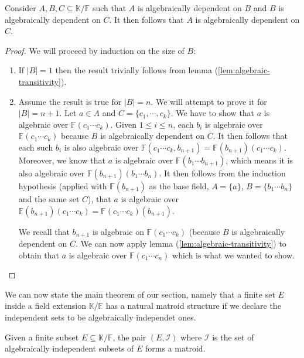 \begin{lemma}\label{lem:algebraic-dependence-transitivity}
	Consider $A, B, C \subseteq \mathbb K / \mathbb{F} $ such that $A$ is algebraically dependent on $B$ and $B$ is algebraically dependent on $C$. It then follows that $A$ is algebraically dependent on $C$.
\end{lemma}

\begin{proof}
	We will proceed by induction on the size of $B$:
	\begin{enumerate}
		\item If $|B| = 1$ then the result trivially follows from lemma (\ref{lem:algebraic-transitivity}).
		\item Assume the result is true for $|B| = n$. We will attempt to prove it for $|B| = n + 1$. Let $a \in A$ and $C = \{c_1, \cdots, c_k\}$. We have to show that $a$ is algebraic over $\mathbb{F}(c _1 \cdots c _k )$. Given $1 \leq i \leq n$, each $b _i$ is algebraic over $\mathbb{F}(c _1 \cdots c _k )$ because $B$ is algebraically dependent on $C$. It then follows that each such $b _i $ is also algebraic over $\mathbb{F}(c _1 \cdots c _k, b _{n + 1}) = \mathbb{F} (b _{n + 1} )(c _1 \cdots c _k )$. Moreover, we know that $a$ is algebraic over $\mathbb{F} (b _1 \cdots b _{n + 1})$, which means it is also algebraic over $\mathbb{F} (b _{n + 1})(b _1 \cdots b _n )$. It then follows from the induction hypothesis (applied with $\mathbb{F} (b _{n + 1})$ as the base field, $A = \{a\}$, $B = \{b _1 \cdots b _n \}$ and the same set $C$), that $a$ is algebraic over $\mathbb{F} (b _{n + 1})(c _1 \cdots c _k ) = \mathbb{F} (c _1 \cdots c _k )(b _{n + 1})$.

		      We recall that $b _{n + 1}$ is algebraic on $\mathbb{F} (c _1 \cdots c _k )$ (because $B$ is algebraically dependent on $C$. We can now apply lemma (\ref{lem:algebraic-transitivity}) to obtain that $a$ is algebraic over $\mathbb{F} (c _1 \cdots c _n)$ which is what we wanted to show.
	\end{enumerate}
\end{proof}

We can now state the main theorem of our section, namely that a finite set $E$ inside a field extension $\mathbb{K}/\mathbb{F}$ has a natural matroid structure if we declare the independent sets to be algebraically independet ones.

\begin{theorem}\label{thm:algebraic-matroids-are-matroids}
	Given a finite subset $E \subseteq \mathbb K / \mathbb F$, the pair $(E, \mathcal I)$  where $\mathcal I$ is the set of algebraically independent subsets of $E$ forms a matroid.
\end{theorem}

